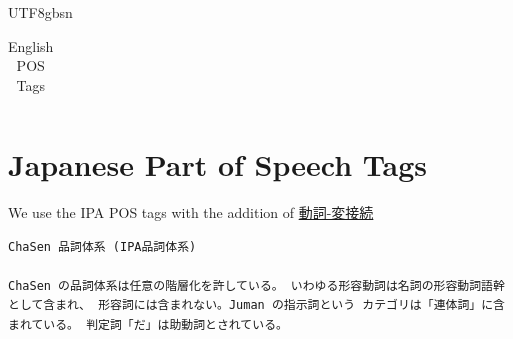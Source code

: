 \documentclass[12pt]{book} %
\newcommand{\tg}[1]{\url{#1}}  %
\begin{document}
\begin{CJK}{UTF8}{gbsn}
\begin{table}
\begin{tabular}{lll}
  \end{tabular}
  \caption{English POS Tags}
  \label{tab:eng-pos}
\end{table}

\section{Japanese Part of Speech Tags}

We use the IPA POS tags with the addition of \tg{動詞-変接続}
\begin{verbatim}
ChaSen 品詞体系 (IPA品詞体系)

ChaSen の品詞体系は任意の階層化を許している。 いわゆる形容動詞は名詞の形容動詞語幹として含まれ、 形容詞には含まれない。Juman の指示詞という カテゴリは「連体詞」に含まれている。 判定詞「だ」は助動詞とされている。


\end{verbatim}
\end{CJK}
\end{document}
